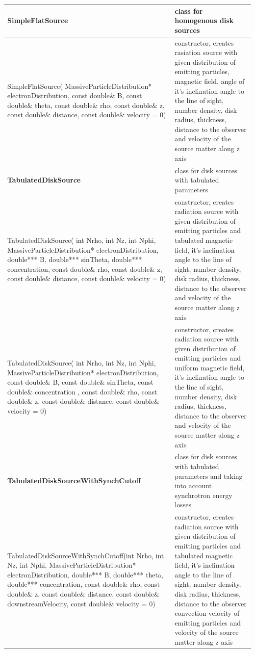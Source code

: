 \begin{small}
\begin{xtabular}{|p{0.5\textwidth}|p{0.5\textwidth}|}
		\hline
		\textbf{SimpleFlatSource} & class for homogenous disk sources\\
		\hline
		SimpleFlatSource( MassiveParticleDistribution* electronDistribution, const double\& B, const double\& theta, const double\& rho, const double\& z, const double\& distance, const double\& velocity = 0) & constructor, creates rasiation source with given distribution of emitting particles, magnetic field, angle of it's inclination angle to the line of sight, number density, disk radius, thickness, distance to the observer and velocity of the source matter along z axis \\
		\hline
		\textbf{TabulatedDiskSource} & class for disk sources with tabulated parameters\\
		\hline
		TabulatedDiskSource( int Nrho, int Nz, int Nphi, MassiveParticleDistribution* electronDistribution, double*** B, double*** sinTheta, double*** concentration, const double\& rho, const double\& z, const double\& distance, const double\& velocity = 0) & constructor, creates radiation source with given distribution of emitting particles and tabulated magnetic field, it's inclination angle to the line of sight, number density, disk radius, thickness, distance to the observer and velocity of the source matter along z axis\\
		\hline
		TabulatedDiskSource( int Nrho, int Nz, int Nphi, MassiveParticleDistribution* electronDistribution, const double\& B, const double\& sinTheta, const double\& concentration , const double\& rho, const double\& z, const double\& distance, const double\& velocity = 0) & constructor, creates radiation source with given distribution of emitting particles and uniform magnetic field, it's inclination angle to the line of sight, number density, disk radius, thickness, distance to the observer and velocity of the source matter along z axis\\
		\hline
		\textbf{TabulatedDiskSourceWithSynchCutoff} & class for disk sources with tabulated parameters and taking into account synchrotron energy losses\\
		\hline
		TabulatedDiskSourceWithSynchCutoff(int Nrho, int Nz, int Nphi, MassiveParticleDistribution* electronDistribution, double*** B, double*** theta, double*** concentration, const double\& rho, const double\& z, const double\& distance, const double\& downstreamVelocity, const double\& velocity = 0) &
		constructor, creates radiation source with given distribution of emitting particles and tabulated magnetic field, it's inclination angle to the line of sight, number density, disk radius, thickness, distance to the observer convection velocity of emitting particles and velocity of the source matter along z axis\\

\end{xtabular}
\end{small}
